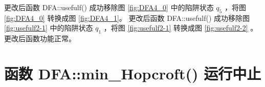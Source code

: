 更改后函数 DFA::usefulf() 成功移除图 \ref{fig:DFA4_0} 中的陷阱状态 $q_5$ ，将图 \ref{fig:DFA4_0} 转换成图 \ref{fig:DFA4_1}。
更改后函数 DFA::usefulf() 成功移除图 \ref{fig:usefulf2-1} 中的陷阱状态 $q_1$ ，将图 \ref{fig:usefulf2-1} 转换成图 \ref{fig:usefulf2-2} 。
更改后函数功能正常。



\section{函数 DFA::min\_Hopcroft() 运行中止}\label{sec:hopcroft}

